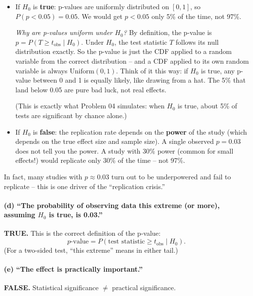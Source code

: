 \documentclass[11pt]{article}
\begin{document}
\begin{itemize}
  \item If $H_0$ is \textbf{true}: p-values are uniformly distributed on $[0, 1]$, so $P(p < 0.05) = 0.05$. We would get $p < 0.05$ only 5\% of the time, not 97\%.

  \textit{Why are p-values uniform under $H_0$?} By definition, the p-value is $p = P(T \geq t_{\text{obs}} \mid H_0)$. Under $H_0$, the test statistic $T$ follows its null distribution exactly. So the p-value is just the CDF applied to a random variable from the correct distribution -- and a CDF applied to its own random variable is always $\text{Uniform}(0,1)$. Think of it this way: if $H_0$ is true, any p-value between 0 and 1 is equally likely, like drawing from a hat. The 5\% that land below 0.05 are pure bad luck, not real effects.

  (This is exactly what Problem 04 simulates: when $H_0$ is true, about 5\% of tests are significant by chance alone.)

  \item If $H_0$ is \textbf{false}: the replication rate depends on the \textbf{power} of the study (which depends on the true effect size and sample size). A single observed $p = 0.03$ does not tell you the power. A study with 30\% power (common for small effects!) would replicate only 30\% of the time -- not 97\%.
\end{itemize}

In fact, many studies with $p \approx 0.03$ turn out to be underpowered and fail to replicate -- this is one driver of the ``replication crisis.''

\paragraph{(d) ``The probability of observing data this extreme (or more), assuming $H_0$ is true, is 0.03.''}

\textbf{TRUE.} This is the correct definition of the p-value:
\[
  p\text{-value} = P(\text{test statistic} \geq t_{\text{obs}} \mid H_0).
\]
(For a two-sided test, ``this extreme'' means in either tail.)

\paragraph{(e) ``The effect is practically important.''}

\textbf{FALSE.} Statistical significance $\neq$ practical significance.
\end{document}
